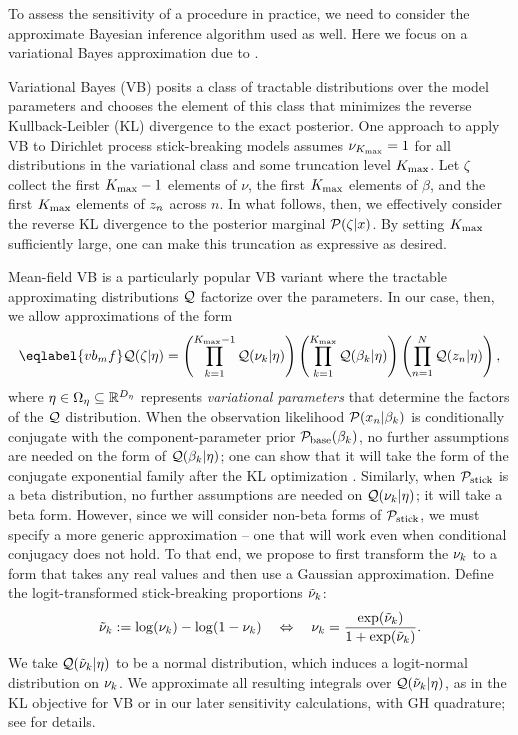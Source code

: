 To assess the sensitivity of a procedure in practice, we need to consider the
approximate Bayesian inference algorithm used as well. Here we focus on a
variational Bayes approximation due to \citet{blei:2006:vi_for_dp}.

Variational Bayes (VB) posits a class of tractable distributions over the model
parameters and chooses the  element of this class that minimizes the reverse
Kullback-Leibler (KL) divergence to the exact posterior.  One approach to apply
VB to Dirichlet process stick-breaking models assumes $\nu_{K_{\mathrm{max}}} = 1$ for all
distributions in the variational class and some truncation level ${K_{\mathrm{max}}}$. Let
$\zeta$ collect the first ${K_{\mathrm{max}}} - 1$ elements of $\nu$, the first ${K_{\mathrm{max}}}$
elements of $\beta$, and the first ${K_{\mathrm{max}}}$ elements of $z_n$ across $n$. In
what follows, then, we effectively consider the reverse KL divergence to the
posterior marginal $\mathcal{P}(\zeta \vert x)$. By setting ${K_{\mathrm{max}}}$ sufficiently large,
one can make this truncation as expressive as desired.

Mean-field VB is a particularly popular VB variant where the tractable
approximating distributions $\mathcal{Q}$ factorize over the parameters. In our case,
then, we allow approximations of the form
%
\begin{align}\eqlabel{vb_mf}
%
\q(\zeta \vert \eta) =
    \left( \prod_{\k=1}^{\kmax - 1} \q(\nuk \vert \eta) \right)
    \left( \prod_{\k=1}^{\kmax} \q(\beta_\k \vert \eta) \right)
    \left( \prod_{\n=1}^{\N} \q(\z_{\n} \vert \eta) \right),
%
\end{align}
%
where $\eta \in \Omega_{\eta} \subseteq \mathbb{R}^{{D_{\eta}}}$ represents
\emph{variational parameters} that determine the factors of the $\mathcal{Q}$
distribution. When the observation likelihood $\mathcal{P}(x_n \vert \beta_k)$ is
conditionally conjugate with the component-parameter prior
$\mathcal{P}_{\mathrm{base}}(\beta_k)$, no further assumptions are needed on the form of
$\mathcal{Q}(\beta_k \vert \eta)$; one can show that it will take the form of the
conjugate exponential family after the KL optimization
\citep{blei:2017:vi_review}. Similarly, when $\mathcal{P}_{\mathrm{stick}}$ is a beta distribution,
no further assumptions are needed on $\mathcal{Q}(\nu_{k} \vert \eta)$; it will take a beta
form. However, since we will consider non-beta forms of $\mathcal{P}_{\mathrm{stick}}$, we must
specify a more generic approximation -- one that will work even when conditional
conjugacy does not hold.  To that end, we propose to first transform the
$\nu_{k}$ to a form that takes any real values and then use a Gaussian
approximation. Define the logit-transformed stick-breaking proportions $\tilde{\nu}_{k}$:
%
\begin{align*}
  \lnu_\k := \log(\nu_\k) - \log(1 - \nu_\k)
  \quad \Leftrightarrow \quad
  \nuk = \frac{\exp(\lnu_\k)}{1 + \exp(\lnu_\k)}.
\end{align*}
%
We take $\mathcal{Q}(\tilde{\nu}_{k} \vert \eta)$ to be a normal distribution, which induces a
logit-normal distribution on $\nu_{k}$. We approximate all resulting integrals over
$\mathcal{Q}(\tilde{\nu}_{k} \vert \eta)$, as in the KL objective for VB or in our later
sensitivity calculations, with GH quadrature; see  for
details.

